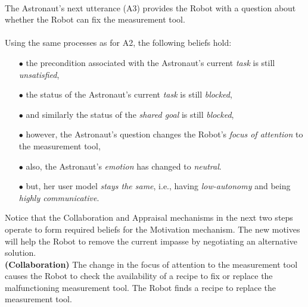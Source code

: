 \noindent {}\\

The Astronaut's next utterance (A3) provides the Robot with a question about
whether the Robot can fix the measurement tool.\\

\noindent{}\\

\noindent Using the same processes as for A2, the following beliefs hold:

\begin{itemize}
  \item[$\bullet$] the precondition associated with the Astronaut's current
  \textit{task} is still \textit{unsatisfied},
  \item[$\bullet$] the status of the Astronaut's current \textit{task} is still
  \textit{blocked},
  \item[$\bullet$] and similarly the status of the \textit{shared goal} is
  still \textit{blocked},
  \item[$\bullet$] however, the Astronaut's question changes the Robot's
  \textit{focus of attention} to the measurement tool,
  \item[$\bullet$] also, the Astronaut's \textit{emotion} has changed to
  \textit{neutral}.
  \item[$\bullet$] but, her user model \textit{stays the same}, i.e., having
  \textit{low-autonomy} and being \textit{highly communicative}.
\end{itemize}

Notice that the Collaboration and Appraisal mechanisms in the next two steps
operate to form required beliefs for the Motivation mechanism. The new motives
will help the Robot to remove the current impasse by negotiating an alternative
solution.\\

\noindent\textbf{(Collaboration)} The change in the focus of attention to the
measurement tool causes the Robot to check the availability of a recipe to fix
or replace the malfunctioning measurement tool. The Robot finds a recipe to
replace the measurement tool.\\

